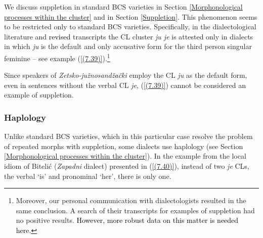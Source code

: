 We discuss suppletion in standard BCS varieties in Section \ref{Morphonological processes within the cluster} and in Section \ref{Suppletion}. This phenomenon seems to be restricted only to standard BCS varieties. Specifically, in the dialectological literature and \textcolor{black}{revised} transcripts the CL cluster \textit{ju je} is attested only in dialects in which \textit{ju} is the default and only accusative form for the third person singular feminine – see example (\ref{(7.39)}).\footnote{Moreover, our personal communication with dialectologists resulted in the same conclusion. A search of their transcripts for examples of suppletion had no positive results. \textcolor{black}{However, more robust data on this matter is needed here.}}


\noindent Since speakers of \textit{Zetsko-južnosandžački} employ the CL \textit{ju} as the default form, even in sentences without the verbal CL \textit{je}, (\ref{(7.39)}) cannot be considered an example of suppletion. 

\subsubsection{Haplology}
\label{Haplology:8}
Unlike standard BCS varieties, which in this particular case resolve the problem of repeated morphs with suppletion, some dialects use haplology (see Section \ref{Morphonological processes within the cluster}). In the example from the local idiom of Bitelić (\textit{Zapadni} dialect) presented in (\ref{(7.40)}), instead of two \textit{je} CLs, the verbal ‘is’ and pronominal ‘her’, there is only one. 



